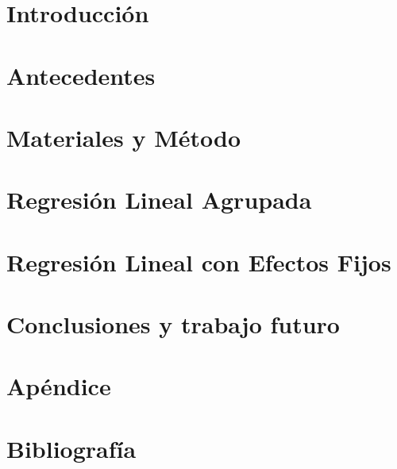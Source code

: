 \documentclass[11pt,a4paper,twoside]{tesis}
\begin{document}
\def\titulo{Licenciatura\xspace}

\def\autor{Juan Manuel Pérez}
\def\tituloTesis{Métricas de mimetización acústico-prosódica en hablantes y su relación con rasgos sociales de diálogos}
\def\runtitulo{\tituloTesis}
\def\director{Agustín Gravano}
\def\codirector{Ramiro H. Gálvez}
\def\lugar{Buenos Aires, 2016}


\frontmatter
\pagestyle{empty}


%

\tableofcontents

\mainmatter
\pagestyle{headings}



\chapter{Introducción}



\chapter{Antecedentes}


\chapter{Materiales y Método}


\chapter{Regresión Lineal Agrupada}


\chapter{Regresión Lineal con Efectos Fijos}


\chapter{Conclusiones y trabajo futuro}


\chapter{Apéndice}



\chapter{Bibliografía}
\backmatter



\end{document}
